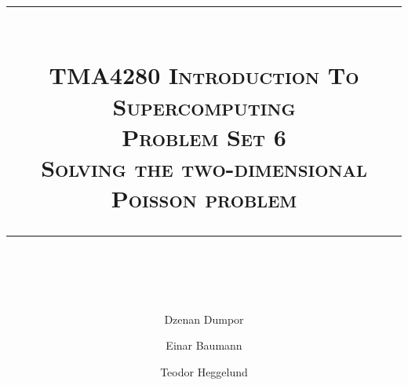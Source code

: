 




\author{Dzenan Dumpor \and Einar Baumann \and Teodor Heggelund}
\title{
    \vspace{-1in}
    \vspace{0.1in}
    \rule{\textwidth}{0.5pt} \\[0.5cm]
    \normalfont \normalsize \textsc{TMA4280 Introduction To Supercomputing} \\ [20pt]
    {\textsc{ \huge Problem Set 6 }} \\ [0.5cm]
    {\textsc {\Large Solving the two-dimensional Poisson problem} } \\
    \vspace{0.1in}
    \rule{\textwidth}{2pt} \\[0.7cm]
}


\maketitle
\thispagestyle{empty}
\clearpage

 \clearpage

\tableofcontents
\clearpage
















\clearpage
\appendix

\clearpage





